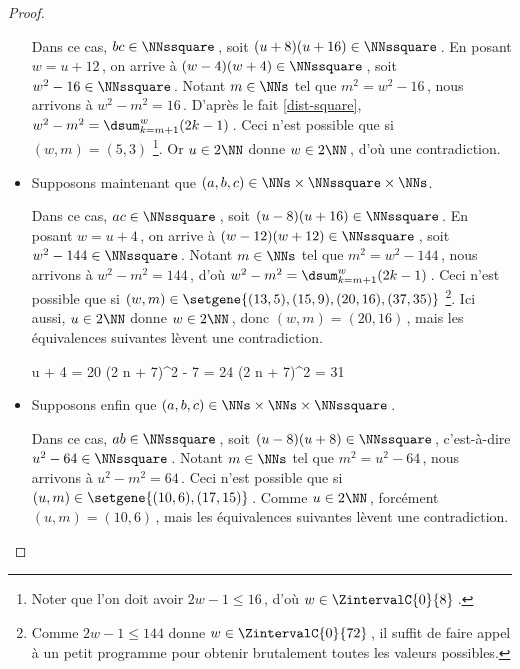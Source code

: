 \begin{proof}
\begin{itemize}
		\smallskip
		\noindent
		Dans ce cas, $bc \in \NNssquare$\,, soit $(u + 8) (u + 16) \in \NNssquare$\,.
		En posant $w = u + 12$\,, on arrive à $(w - 4) (w + 4) \in \NNssquare$\,, soit $w^2 - 16 \in \NNssquare$\,.
		Notant $m \in \NNs$ tel que $m^2 = w^2 - 16$\,, nous arrivons à $w^2 - m^2 = 16$\,.
		D'après le fait \ref{dist-square}, $w^2 - m^2 = \dsum_{k=m+1}^{w} (2 k - 1)$\,.
		Ceci n'est possible que si $(w, m) = (5, 3)$
		\footnote{
			Noter que l'on doit avoir $2 w - 1 \leq 16$\,, d'où $w \in \ZintervalC{0}{8}$\,.
		}.
		Or $u \in 2 \NN$ donne $w \in 2 \NN$\,, d'où une contradiction.		
		
		
		\medskip
		\item Supposons maintenant que $(a, b, c) \in \NNs \times \NNssquare \times \NNs$. 
		
		\smallskip
		\noindent
		Dans ce cas, $ac \in \NNssquare$\,, soit $(u - 8) (u + 16) \in \NNssquare$\,.
		En posant $w = u + 4$\,, on arrive à $(w - 12) (w + 12) \in \NNssquare$\,, soit $w^2 - 144 \in \NNssquare$\,.
		Notant $m \in \NNs$ tel que $m^2 = w^2 - 144$\,, nous arrivons à $w^2 - m^2 = 144$\,, d'où $w^2 - m^2 = \dsum_{k=m+1}^{w} (2 k - 1)$\,.
		Ceci n'est possible que si $(w, m) \in \setgene{(13, 5) , (15, 9) , (20, 16) , (37, 35)}$
		\footnote{
			Comme $2 w - 1 \leq 144$ donne $w \in \ZintervalC{0}{72}$\,, il suffit de faire appel à un petit programme pour obtenir brutalement toutes les valeurs possibles.
		}.
		Ici aussi, $u \in 2 \NN$ donne $w \in 2 \NN$\,, donc $(w, m) = (20, 16)$\,, mais les équivalences suivantes lèvent une contradiction.

		\medskip
		\noindent\!\!%
   		\begin{stepcalc}[style = sar, ope = \iff]
			u + 4 = 20
		\explnext{}
			(2 n + 7)^2 - 7 = 24
		\explnext*{$31 \notin \NNsquare$}{}
			(2 n + 7)^2 = 31
		\end{stepcalc}	
		
		
		\medskip
		\item Supposons enfin que $(a, b, c) \in \NNs \times \NNs \times \NNssquare$\,. 
		
		\smallskip
		\noindent
		Dans ce cas, $ab \in \NNssquare$\,, soit $(u - 8) (u + 8) \in \NNssquare$\,, c'est-à-dire $u^2 - 64 \in \NNssquare$\,.
		Notant $m \in \NNs$ tel que $m^2 = u^2 - 64$\,, nous arrivons à $u^2 - m^2 = 64$\,.
		Ceci n'est possible que si $(u, m) \in \setgene{(10, 6), (17, 15)}$\,.
		Comme $u \in 2 \NN$\,, forcément $(u, m) = (10, 6)$\,, mais les équivalences suivantes lèvent une contradiction.


\end{itemize}
\end{proof}
